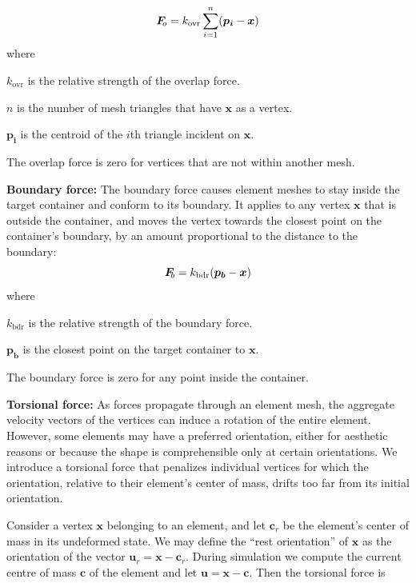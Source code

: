 \begin{equation}
\simforce{o} = k_\mathrm{ovr} \sum_{i = 1}^{n} (\bm{p_{i}} - \bm{x})
\end{equation}
where
\begin{packeddescriptions}
	\item[$k_\mathrm{ovr}$] is the relative strength of the overlap force.
	\item[$n$] is the number of mesh triangles that have $\bm{x}$ as a vertex.
	\item[$\bm{p_{i}}$] is the centroid of the $i$th triangle incident on $\bm{x}$.
\end{packeddescriptions}

The overlap force is zero for vertices that are not within another mesh.

\medskip
\textbf{Boundary force:}
The boundary force causes element meshes to stay inside the target container
and conform to its boundary. It applies to any vertex $\bm{x}$ that
is outside the container, and moves the vertex towards the closest point
on the container's boundary, by an amount proportional to the distance to
the boundary:
\begin{equation}
\simforce{b} = k_\mathrm{bdr} (\bm{p_b} - \bm{x})
\end{equation}
where
\begin{packeddescriptions}
	\item[$k_\mathrm{bdr}$] is the relative strength of the boundary force.
	\item[$\bm{p_b}$] is the closest point on the target container to $\bm{x}$.
\end{packeddescriptions}

The boundary force is zero for any point inside the container.

\medskip
\textbf{Torsional force:} 
As forces propagate through an element mesh, the aggregate velocity
vectors of the vertices can induce a rotation of the entire element.
However, some elements may have a preferred orientation,
either for aesthetic reasons or because the shape is comprehensible only at certain orientations.
We introduce a torsional force that
penalizes individual vertices for which the orientation, relative to their
element's center of mass, drifts too far from its initial orientation.

Consider a vertex $\bm{x}$ belonging
to an element, and let $\bm{c}_r$ be the element's center of mass in
its undeformed state.  We may define the ``rest orientation'' of
$\bm{x}$ as the orientation of the vector $\bm{u}_r = \bm{x}-\bm{c}_r$.
During simulation we compute the current centre of mass $\bm{c}$ of 
the element and let $\bm{u}=\bm{x}-\bm{c}$.  Then the torsional force
is

